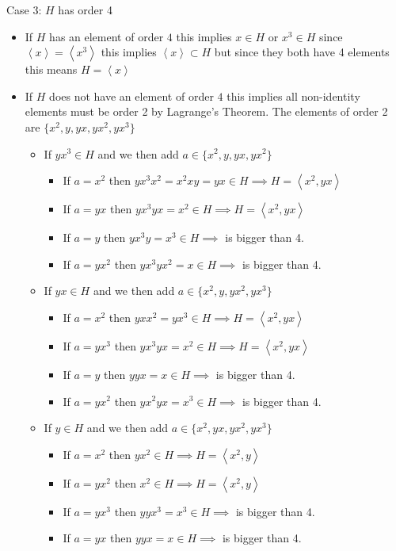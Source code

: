 \documentclass[12pt, letterpaper]{article}
\theoremstyle{definition}
\newcommand{\ang}[1]{\left\langle #1 \right\rangle}
\begin{document}
Case 3: \(H\) has order 4
\begin{itemize}
    \item If $H$ has an element of order $4$ this implies $x \in H$ or $x^3 \in H$ since $\ang{x}=\ang{x^3}$ this implies $\ang{x} \subset H$ but since they both have 4 elements this means $H=\ang{x}$
    \item If $H$ does not have an element of order $4$ this implies all non-identity elements must be order 2 by Lagrange's Theorem. The elements
    of order 2 are $\{x^2,y,yx,yx^2,yx^3\}$
    \begin{itemize}
        \item If $yx^3 \in H$ and we then add $a \in \{x^2,y,yx,yx^2\}$
        \begin{itemize}
            \item If $a=x^2$ then $yx^3x^2=x^2xy=yx \in H \implies H=\ang{x^2,yx}$
            \item If $a=yx$ then $yx^3yx=x^2 \in H \implies H=\ang{x^2,yx}$
            \item If $a=y$ then $yx^3y=x^3 \in H \implies$ is bigger than 4.
            \item If $a=yx^2$ then $yx^3yx^2=x \in H \implies$ is bigger than 4.
        \end{itemize}

        \item If $yx \in H$ and we then add $a \in \{x^2,y,yx^2,yx^3\}$
        \begin{itemize}
            \item If $a=x^2$ then $yxx^2=yx^3 \in H \implies H=\ang{x^2,yx}$
            \item If $a=yx^3$ then $yx^3yx=x^2 \in H \implies H=\ang{x^2,yx}$
            \item If $a=y$ then $yyx=x \in H \implies$ is bigger than 4.
            \item If $a=yx^2$ then $yx^2yx=x^3 \in H \implies$ is bigger than 4.
        \end{itemize}

        \item If $y \in H$ and we then add $a \in \{x^2,yx,yx^2,yx^3\}$
        \begin{itemize}
            \item If $a=x^2$ then $yx^2 \in H \implies H=\ang{x^2,y}$
            \item If $a=yx^2$ then $x^2 \in H \implies H=\ang{x^2,y}$
            \item If $a=yx^3$ then $yyx^3=x^3 \in H \implies$ is bigger than 4.
            \item If $a=yx$ then $yyx=x \in H \implies$ is bigger than 4.
        \end{itemize}


\end{itemize}
\end{itemize}
\end{document}
